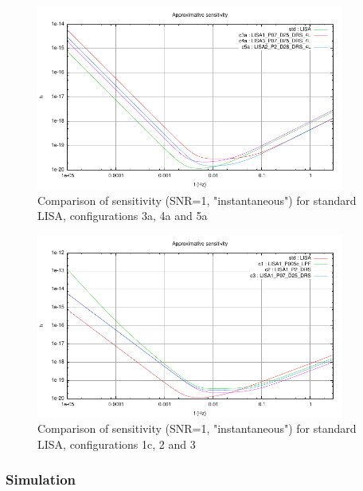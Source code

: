 \documentclass{iopart}
\begin{document}
\begin{figure}[H]
\begin{center}
\includegraphics[width=0.9\textwidth]{FigNoiseOrbSens/Sensitivity_std-c3-c4-c5}
\caption{Comparison of sensitivity (SNR=1, "instantaneous") for standard LISA, configurations 3a, 4a and 5a}
\label{F:SensCompC3C4C5}
\end{center}
\end{figure}


\begin{figure}[H]
\begin{center}
\includegraphics[width=0.9\textwidth]{FigNoiseOrbSens/Sensitivity_std-c1-c2-c3}
\caption{Comparison of sensitivity (SNR=1, "instantaneous") for standard LISA, configurations 1c, 2 and 3}
\label{F:SensCompC1C2C3}
\end{center}
\end{figure}


\subsubsection{Simulation}
\label{SSS:Inst:PSD:Sim}
\end{document}

